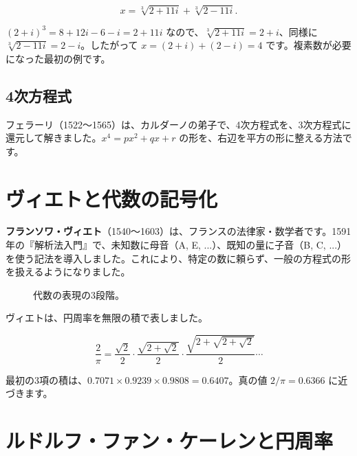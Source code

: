 \documentclass[a4paper,11pt,openany]{ltjsbook}
\begin{document}
\[
x=\sqrt[3]{2+11i}+\sqrt[3]{2-11i}.
\]

$(2+i)^3=8+12i-6-i=2+11i$ なので、$\sqrt[3]{2+11i}=2+i$、同様に $\sqrt[3]{2-11i}=2-i$。したがって $x=(2+i)+(2-i)=4$ です。複素数が必要になった最初の例です。

\subsection{4次方程式}

フェラーリ（1522〜1565）は、カルダーノの弟子で、4次方程式を、3次方程式に還元して解きました。$x^4=px^2+qx+r$ の形を、右辺を平方の形に整える方法です。

\section{ヴィエトと代数の記号化}

\textbf{フランソワ・ヴィエト}（1540〜1603）は、フランスの法律家・数学者です。1591年の『解析法入門』で、未知数に母音（A, E, ...）、既知の量に子音（B, C, ...）を使う記法を導入しました。これにより、特定の数に頼らず、一般の方程式の形を扱えるようになりました。

\begin{figure}[htbp]
\centering
{}
\caption{代数の表現の3段階。}
\end{figure}

ヴィエトは、円周率を無限の積で表しました。

\[
\frac{2}{\pi}=\frac{\sqrt2}{2}\cdot\frac{\sqrt{2+\sqrt2}}{2}\cdot\frac{\sqrt{2+\sqrt{2+\sqrt2}}}{2}\cdots
\]

最初の3項の積は、$0.7071\times0.9239\times0.9808=0.6407$。真の値 $2/\pi=0.6366$ に近づきます。

\section{ルドルフ・ファン・ケーレンと円周率}
\end{document}
